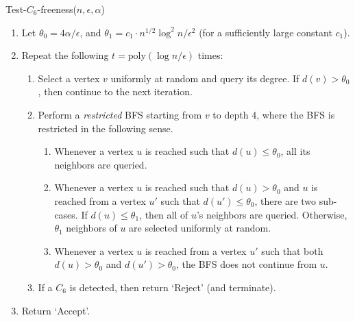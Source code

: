 \documentclass{article}
\newcommand{\eps}{\epsilon}
\newcommand{\poly}{\textrm{poly}}
\newcommand{\commentt}[1]{ {}}
\begin{document}
\medskip\noindent
\textsf{Test-$C_6$-freeness}($n,\epsilon,\alpha$)\label{alg:C6}
\begin{enumerate}
\item Let $\theta_0 = 4 \alpha/\eps$, and $\theta_1 = c_1\cdot n^{1/2}\log^2 n/\eps^2$ 
(for a sufficiently large constant $c_1$).
\item Repeat the following $t= \poly(\log n/\eps)$
times: 
  \begin{enumerate}
     \item Select a vertex $v$ uniformly at random and query its degree.  If $d(v) > \theta_0$, then continue to the next iteration.
     \item Perform a \emph{restricted} BFS starting from $v$ to depth $4$, %
     where the BFS is restricted in the following sense.
         \begin{enumerate}
           \item Whenever a vertex $u$ is reached such that $d(u) \leq \theta_0$, all its neighbors are queried.
           \item Whenever a vertex $u$ is reached such that $d(u) > \theta_0$ and $u$ is reached from a vertex $u'$ such that $d(u') \leq \theta_0$, there are two sub-cases. If $d(u) \leq \theta_1$, then  all of $u$'s neighbors are queried. Otherwise,  $\theta_1$ neighbors of $u$ are selected uniformly at random. \label{step:C6_rand_nbr}
           \item Whenever a vertex $u$ is reached from a vertex $u'$ such that both $d(u)>\theta_0$ and $d(u') > \theta_0$, the BFS does not continue from $u$.
         \end{enumerate}
     \item If a $C_6$ is detected, then return `Reject' (and terminate).

    \end{enumerate}
  \item Return `Accept'.
\end{enumerate}
\end{document}
